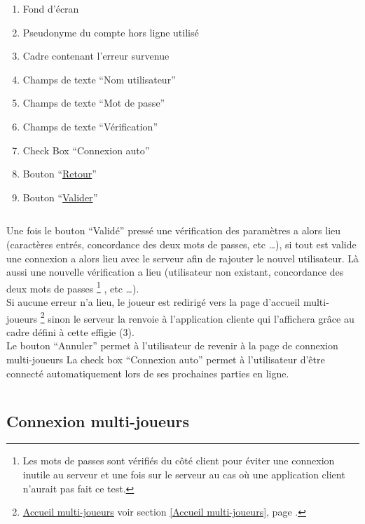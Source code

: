 \documentclass{report}
\begin{document}
		\begin{enumerate}
		  \item Fond d'écran
		  \item Pseudonyme du compte hors ligne utilisé
		  \item Cadre contenant l'erreur survenue
		  \item Champs de texte ``Nom utilisateur''
		  \item Champs de texte ``Mot de passe''
		  \item Champs de texte ``Vérification''
		  \item Check Box ``Connexion auto''
		  \item Bouton ``\hyperlink{Connexion multi-joueurs}{Retour}''
		  \item Bouton ``\hyperlink{Accueil multi-joueurs}{Valider}''
		\end{enumerate}
		
		$\,$
		
		Une fois le bouton ``Validé'' pressé une vérification des paramètres a alors
		lieu (caractères entrés, concordance des deux mots de passes, etc \ldots), si
		tout est valide une connexion a alors lieu avec le serveur afin de rajouter le
		nouvel utilisateur.
		Là aussi une nouvelle vérification a lieu (utilisateur non existant,
		concordance des deux mots de passes%
		\footnote[1]{
			Les mots de passes sont vérifiés du côté client pour éviter une connexion
			inutile au serveur et une fois sur le serveur au cas où une application
			client n'aurait pas fait ce test.
		}
		, etc \ldots).\\
		Si aucune erreur n'a lieu, le joueur est redirigé vers la page d'accueil
		multi-joueurs%
		\footnote[2]{
			\hyperlink{Accueil multi-joueurs}{Accueil multi-joueurs}
			\og voir section \ref{Accueil multi-joueurs}, page \pageref{Accueil multi-joueurs}.\fg
		}
		sinon le serveur la renvoie à l'application cliente qui l'affichera grâce au
		cadre défini à cette effigie (3).\\
		Le bouton ``Annuler'' permet à l'utilisateur de revenir à la page de connexion
		multi-joueurs
		\footnotemark[1]
		La check box ``Connexion auto'' permet à l'utilisateur d'être connecté
		automatiquement lors de ses prochaines parties en ligne.
				
		$\,$
	
\newpage

	\subsection{Connexion multi-joueurs}
	
\end{document}
